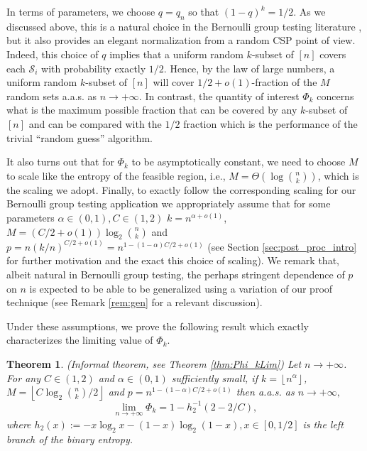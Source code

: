 \documentclass[12pt,reqno]{amsart}
\numberwithin{equation}{section}
\newtheorem{theorem}{Theorem}[section]
\theoremstyle{definition}
\newcommand{\floor}[1]{\left\lfloor #1 \right\rfloor}
\renewcommand{\[}{\begin{equation}}
\renewcommand{\]}{\end{equation}}
\renewcommand{\|}{\bigg{|}}
\begin{document}

In terms of parameters, we choose $q=q_n$ so that $(1-q)^k=1/2$. As we discussed above, this is a natural choice in the Bernoulli group testing literature \cite{Aldridge_2019}, but it also provides an elegant normalization from a random CSP point of view. Indeed, this choice of $q$ implies that a uniform random $k$-subset of $[n]$ covers each $\mathcal{S}_i$ with probability exactly $1/2$. Hence, by the law of large numbers, a uniform random $k$-subset of $[n]$ will cover $1/2+o(1)$-fraction of the $M$ random sets a.a.s. as $n \rightarrow +\infty.$ In contrast, the quantity of interest $\Phi_k$ concerns what is the maximum possible fraction that can be covered by any $k$-subset of $[n]$ and can be compared with the $1/2$ fraction which is the performance of the trivial ``random guess'' algorithm.

It also turns out that for $\Phi_k$ to be asymptotically constant, we need to choose $M$ to scale like the entropy of the feasible region, i.e., $M=\Theta(\log \binom{n}{k})$, which is the scaling we adopt. Finally, to exactly follow the corresponding scaling for our Bernoulli group testing application we appropriately assume that for some parameters $\alpha \in (0,1), C \in (1,2)$ $k=n^{\alpha+o(1)}$, $M=(C/2+o(1)) \log_2 \binom{n}{k}$  and $p=n(k/n)^{C/2+o(1)}=n^{1-(1-\alpha)C/2+o(1)}$ (see Section \ref{sec:post_proc_intro} for further motivation and the exact this choice of scaling). We remark that, albeit natural in Bernoulli group testing, the perhaps stringent dependence of $p$ on $n$ is expected to be able to be generalized using a variation of our proof technique (see Remark \ref{rem:gen} for a relevant discussion).


Under these assumptions, we prove the following result which exactly characterizes the limiting value of $\Phi_k$. 

\begin{theorem}(Informal theorem, see Theorem \ref{thm:Phi_kLim})
     Let $n \rightarrow +\infty$. For any $C \in (1,2)$ and $\alpha \in (0,1)$ sufficiently small, if $k=\floor{n^{\alpha}}$, $ M=\floor{C \log_2 \binom{n}{k}/2}$ and $p=n^{1-(1-\alpha)C/2+o(1)}$ then a.a.s. as $n \rightarrow +\infty,$ 
     \[
         \lim_{n \rightarrow +\infty} \Phi_k=1-h^{-1}_2\left(2-2/C\right),
     \]where $h_2(x):=-x\log_2 x-(1-x)\log_2 (1-x), x \in [0,1/2]$ is the left branch of the binary entropy. 
 \end{theorem}  
\end{document}
